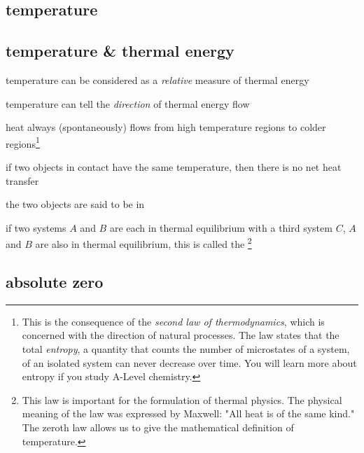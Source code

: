 

\subsection{temperature}

\subsection{temperature \& thermal energy}

\cmt temperature can be considered as a \emph{relative} measure of thermal energy

temperature can tell the \emph{direction} of thermal energy flow

heat always (spontaneously) flows from high temperature regions to colder regions\footnote{This is the consequence of the \emph{second law of thermodynamics}, which is concerned with the direction of natural processes. The law states that the total \emph{entropy}, a quantity that counts the number of microstates of a system, of an isolated system can never decrease over time. You will learn more about entropy if you study A-Level chemistry.}

\cmt if two objects in contact have the same temperature, then there is no net heat transfer

the two objects are said to be in 

\cmt if two systems $A$ and $B$ are each in thermal equilibrium with a third system $C$, $A$ and $B$ are also in thermal equilibrium, this is called the 
\footnote{This law is important for the formulation of thermal physics. The physical meaning of the law was expressed by Maxwell: "All heat is of the same kind." The zeroth law allows us to give the mathematical definition of temperature.}


\subsection{absolute zero}\label{s-abs-zero}

